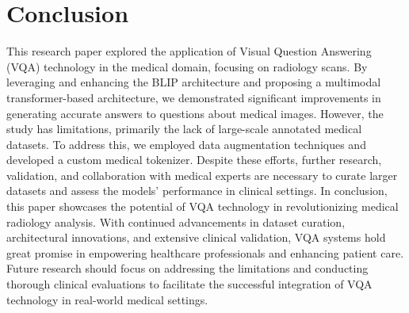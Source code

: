 \documentclass[pdflatex,sn-mathphys-num]{sn-jnl}%
\begin{document}
\section{Conclusion}\label{sec5}
This research paper explored the application of Visual Question Answering (VQA) technology in the medical domain, focusing on radiology scans. By leveraging and enhancing the BLIP architecture and proposing a multimodal transformer-based architecture, we demonstrated significant improvements in generating accurate answers to questions about medical images.
However, the study has limitations, primarily the lack of large-scale annotated medical datasets. To address this, we employed data augmentation techniques and developed a custom medical tokenizer. Despite these efforts, further research, validation, and collaboration with medical experts are necessary to curate larger datasets and assess the models' performance in clinical settings.
In conclusion, this paper showcases the potential of VQA technology in revolutionizing medical radiology analysis. With continued advancements in dataset curation, architectural innovations, and extensive clinical validation, VQA systems hold great promise in empowering healthcare professionals and enhancing patient care. Future research should focus on addressing the limitations and conducting thorough clinical evaluations to facilitate the successful integration of VQA technology in real-world medical settings.





\end{document}
